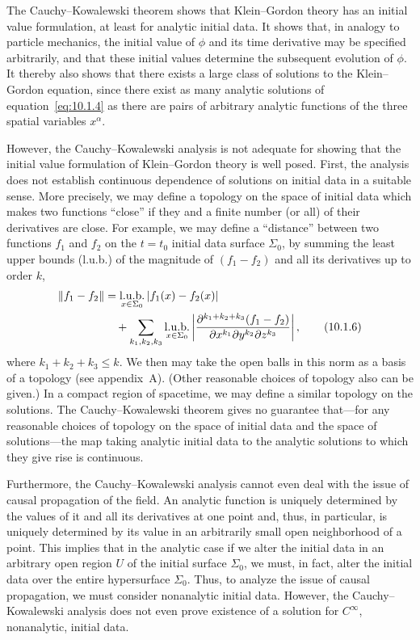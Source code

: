 The Cauchy--Kowalewski theorem shows that Klein--Gordon theory has an initial
value formulation, at least for analytic initial data. It shows that, in analogy to particle
mechanics, the initial value of \(\phi\) and its time derivative may be specified
arbitrarily, and that these initial values determine the subsequent evolution of \(\phi\).
It thereby also shows that there exists a large class of solutions to the Klein--Gordon
equation, since there exist as many analytic solutions of equation~\eqref{eq:10.1.4}
as there are pairs of arbitrary analytic functions of the three spatial variables
\(x^\alpha\).

However, the Cauchy--Kowalewski analysis is not adequate for showing that the
initial value formulation of Klein--Gordon theory is well posed. First, the analysis
does not establish continuous dependence of solutions on initial data in a suitable
sense. More precisely, we may define a topology on the space of initial data which
makes two functions ``close'' if they and a finite number (or all) of their derivatives
are close. For example, we may define a ``distance'' between two functions \(f_1\)
and \(f_2\) on the \(t=t_0\) initial data surface \(\Sigma_0\), by summing the least
upper bounds (l.u.b.) of the magnitude of \((f_1-f_2)\) and all its derivatives up to
order \(k\),
\begin{align}
  \lVert f_1-f_2\rVert
  &={\mathop{\rm l.u.b.}_{x\in\Sigma_0}}\,|f_1(x)-f_2(x)| \notag\\
  &\quad+\sum_{k_1,k_2,k_3}
  {\mathop{\rm l.u.b.}_{x\in\Sigma_0}}
  \left|
    \frac{\partial^{k_1+k_2+k_3}(f_1-f_2)}
    {\partial x^{k_1}\partial y^{k_2}\partial z^{k_3}}
  \right|,
  \tag{10.1.6}\label{eq:10.1.6}
\end{align}
where \(k_1+k_2+k_3\leq k\). We then may take the open balls in this norm as a
basis of a topology (see appendix~A). (Other reasonable choices of topology also
can be given.) In a compact region of spacetime, we may define a similar topology
on the solutions. The Cauchy--Kowalewski theorem gives no guarantee that---for any
reasonable choices of topology on the space of initial data and the space of
solutions---the map taking analytic initial data to the analytic solutions to which they
give rise is continuous.

Furthermore, the Cauchy--Kowalewski analysis cannot even deal with the issue of
causal propagation of the field. An analytic function is uniquely determined by the
values of it and all its derivatives at one point and, thus, in particular, is uniquely
determined by its value in an arbitrarily small open neighborhood of a point. This
implies that in the analytic case if we alter the initial data in an arbitrary open region
\(U\) of the initial surface \(\Sigma_0\), we must, in fact, alter the initial data over
the entire hypersurface \(\Sigma_0\). Thus, to analyze the issue of causal propagation,
we must consider nonanalytic initial data. However, the Cauchy--Kowalewski analysis
does not even prove existence of a solution for \(C^\infty\), nonanalytic, initial data.

